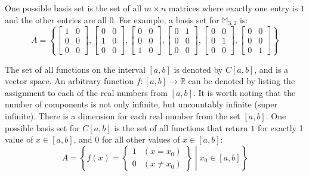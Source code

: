 \documentclass{article}
\begin{document}
One possible basis set is the set of all \(m \times n\) matrices where exactly one entry is \(1\) and the other entries are all \(0\). For example, a basis set for \(\mathbb{M}_{3,2}\) is:
\[A = \left\{\begin{bmatrix} 1 & 0 \\ 0 & 0 \\ 0 & 0 \end{bmatrix}, \begin{bmatrix} 0 & 0 \\ 1 & 0 \\ 0 & 0 \end{bmatrix}, \begin{bmatrix} 0 & 0 \\ 0 & 0 \\ 1 & 0 \end{bmatrix}, \begin{bmatrix} 0 & 1 \\ 0 & 0 \\ 0 & 0 \end{bmatrix}, \begin{bmatrix} 0 & 0 \\ 0 & 1 \\ 0 & 0 \end{bmatrix}, \begin{bmatrix} 0 & 0 \\ 0 & 0 \\ 0 & 1 \end{bmatrix}\right\}\]

\vspace{5mm}

The set of all functions on the interval \([a, b]\) is denoted by \(C[a, b]\), and is a vector space. An arbitrary function \(f : [a, b] \rightarrow \mathbb{R}\) can be denoted by listing the assignment to each of the real numbers from \([a, b]\). It is worth noting that the number of components is not only infinite, but uncountably infinite (super infinite). There is a dimension for each real number from the set \([a, b]\). One possible basis set for \(C[a, b]\) is the set of all functions that return \(1\) for exactly 1 value of \(x \in [a, b]\), and \(0\) for all other values of \(x \in [a, b]\):
\[A = \left\{f(x) = \left\{\begin{array}{cc} 1 & (x = x_0) \\ 0 & (x \neq x_0) \end{array}\right\}\middle| x_0 \in [a, b]\right\}\]

\vspace{5mm}
\end{document}
